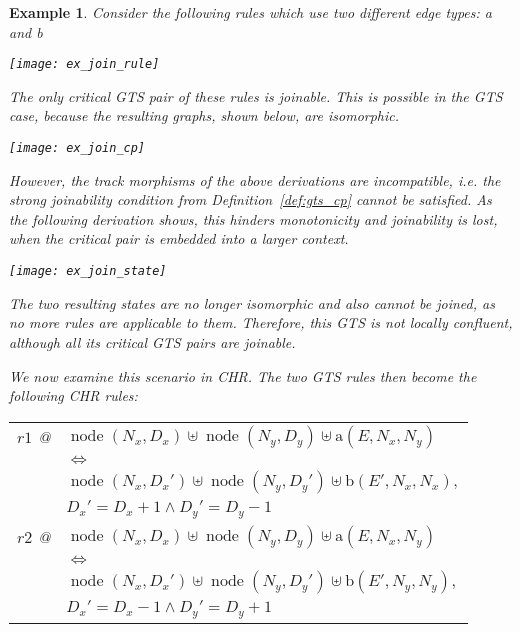 \documentclass{tlp}
\newtheorem{example}{Example}[section]
\DeclareMathOperator{\node}{node}
\begin{document}
\begin{example}

Consider the following rules which use two different edge types: a and b
\begin{center} 
\texttt{[image: ex\_join\_rule]}
\end{center}

The only critical GTS pair of these rules is joinable. This is possible in the
GTS case, because the resulting graphs, shown below, are isomorphic.

\begin{center}
\texttt{[image: ex\_join\_cp]} 
\end{center}
 

However, the track morphisms of the above derivations are incompatible, i.e. the
strong joinability condition from Definition~\ref{def:gts_cp} cannot be
satisfied. As the following derivation shows, this hinders monotonicity and
joinability is lost, when the critical pair is embedded into a larger context.

\begin{center}
\texttt{[image: ex\_join\_state]} 
\end{center}

The two resulting states are no longer isomorphic and also cannot be joined, as
no more rules are applicable to them. Therefore, this GTS is not locally
confluent, although all its critical GTS pairs are joinable.

We now examine this scenario in CHR. The two GTS rules then become the
following CHR rules:

\begin{center} 
\begin{tabular}{ll}
$r1$ @ & $\node(N_x, D_x) \uplus \node(N_y, D_y) \uplus \text{a}(E, N_x, N_y)$
\\ & $\Leftrightarrow$ \\
& $\node(N_x,D_x') \uplus \node(N_y, D_y') \uplus \text{b}(E', N_x, N_x), $\\
& $D_x' = D_x{+}1 \land D_y' = D_y{-}1$\\
$r2$ @ & $\node(N_x, D_x) \uplus \node(N_y, D_y) \uplus \text{a}(E, N_x,
N_y)$\\ & $\Leftrightarrow$ \\
& $\node(N_x,D_x') \uplus \node(N_y, D_y') \uplus \text{b}(E', N_y, N_y),$\\
& $D_x' = D_x{-}1 \land D_y' = D_y{+}1$
\end{tabular}
\end{center}


\end{example}
\end{document}
